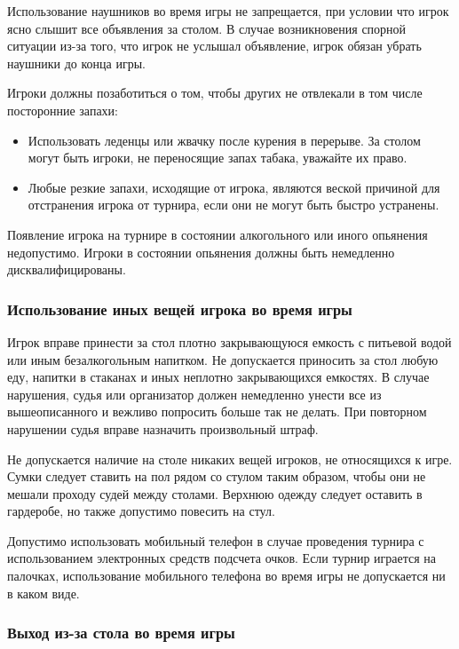 Использование наушников во время игры не запрещается, при условии что игрок ясно слышит все объявления за столом. В случае возникновения спорной ситуации из-за того, что игрок не услышал объявление, игрок обязан убрать наушники до конца игры.

Игроки должны позаботиться о том, чтобы других не отвлекали в том числе посторонние запахи:
\begin{itemize}
	\item Использовать леденцы или жвачку после курения в перерыве. За столом могут быть игроки, не переносящие запах табака, уважайте их право.
	\item Любые резкие запахи, исходящие от игрока, являются веской причиной для отстранения игрока от турнира, если они не могут быть быстро устранены.
\end{itemize}

Появление игрока на турнире в состоянии алкогольного или иного опьянения недопустимо. Игроки в состоянии опьянения должны быть немедленно дисквалифицированы.

\subsubsection{Использование иных вещей игрока во время игры}

Игрок вправе принести за стол плотно закрывающуюся емкость с питьевой водой или иным безалкогольным напитком. Не допускается приносить за стол любую еду, напитки в стаканах и иных неплотно закрывающихся емкостях. В случае нарушения, судья или организатор должен немедленно унести все из вышеописанного и вежливо попросить больше так не делать. При повторном нарушении судья вправе назначить произвольный штраф.

Не допускается наличие на столе никаких вещей игроков, не относящихся к игре. Сумки следует ставить на пол рядом со стулом таким образом, чтобы они не мешали проходу судей между столами. Верхнюю одежду следует оставить в гардеробе, но также допустимо повесить на стул.

Допустимо использовать мобильный телефон в случае проведения турнира с использованием электронных средств подсчета очков. Если турнир играется на палочках, использование мобильного телефона во время игры не допускается ни в каком виде.

\subsubsection{Выход из-за стола во время игры}

